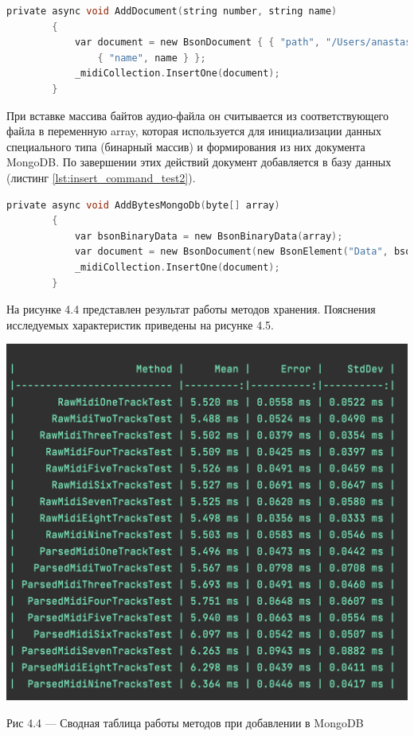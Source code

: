\newpage

\begin{lstlisting}[language=C, label=some-code, caption=Добавление MIDI-файла в MongoDB c использованием реализованного метода, label=lst:insert_command_test1]
private async void AddDocument(string number, string name)
        {
            var document = new BsonDocument { { "path", "/Users/anastasia/Desktop/Audiofiles/Interstellar" + number + ".mid" }, 
                { "name", name } };
            _midiCollection.InsertOne(document);
        }
\end{lstlisting}

При вставке массива байтов аудио-файла он считывается из соответствующего файла в переменную array, которая используется для инициализации данных специального типа (бинарный массив) и формирования из них документа MongoDB. По завершении этих действий документ добавляется в базу данных (листинг \ref{lst:insert_command_test2}).

\begin{lstlisting}[language=C, label=some-code, caption=Добавление MIDI-файла в MongoDB в виде массива байтов, label=lst:insert_command_test2]
private async void AddBytesMongoDb(byte[] array)
        {
            var bsonBinaryData = new BsonBinaryData(array);
            var document = new BsonDocument(new BsonElement("Data", bsonBinaryData));
            _midiCollection.InsertOne(document);
        }
\end{lstlisting}

На рисунке 4.4 представлен результат работы методов хранения. Пояснения исследуемых характеристик приведены на рисунке 4.5.

\begin{center}
		\includegraphics[scale=0.6]{tex/img/InsertClean.png}
		
			Рис 4.4 — Сводная таблица работы методов при добавлении в MongoDB
\end{center}

